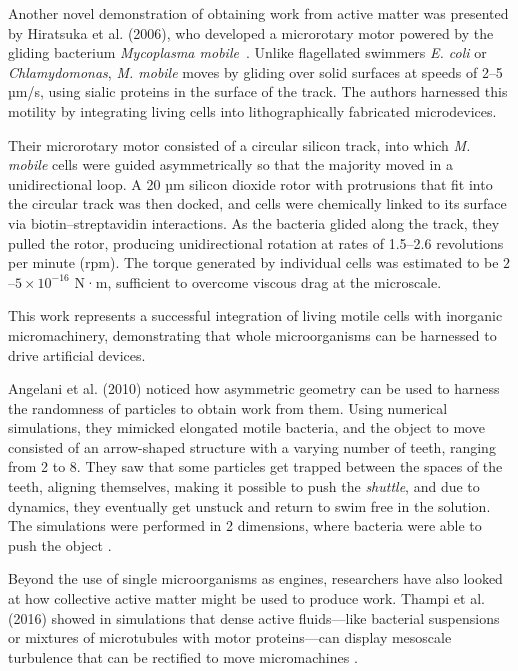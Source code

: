 Another novel demonstration of obtaining work from active matter was presented by Hiratsuka et al. (2006), who developed a microrotary motor powered by the gliding bacterium \textit{Mycoplasma mobile}~\cite{hiratsuka2006microrotary}. Unlike flagellated swimmers \textit{E. coli} or \textit{Chlamydomonas}, \textit{M. mobile} moves by gliding over solid surfaces at speeds of 2–5 µm/s, using sialic proteins in the surface of the track. The authors harnessed this motility by integrating living cells into lithographically fabricated microdevices.

Their microrotary motor consisted of a circular silicon track, into which \textit{M. mobile} cells were guided asymmetrically so that the majority moved in a unidirectional loop. A 20 µm silicon dioxide rotor with protrusions that fit into the circular track was then docked, and cells were chemically linked to its surface via biotin–streptavidin interactions. As the bacteria glided along the track, they pulled the rotor, producing unidirectional rotation at rates of 1.5–2.6 revolutions per minute (rpm). The torque generated by individual cells was estimated to be $2$–$5\times10^{-16}$ N·m, sufficient to overcome viscous drag at the microscale.

This work represents a successful integration of living motile cells with inorganic micromachinery, demonstrating that whole microorganisms can be harnessed to drive artificial devices. 


Angelani et al. (2010) noticed how asymmetric geometry can be used to harness the randomness of particles to obtain work from them. Using numerical simulations, they mimicked elongated motile bacteria, and the object to move consisted of an arrow-shaped structure with a varying number of teeth, ranging from 2 to 8. They saw that some particles get trapped between the spaces of the teeth, aligning themselves, making it possible to push the \textit{shuttle}, and due to dynamics, they eventually get unstuck and return to swim free in the solution. The simulations were performed in 2 dimensions, where bacteria were able to push the object \cite{angelani2010geometrically}.

Beyond the use of single microorganisms as engines, researchers have also looked at how collective active matter might be used to produce work. Thampi et al. (2016) showed in simulations that dense active fluids—like bacterial suspensions or mixtures of microtubules with motor proteins—can display mesoscale turbulence that can be rectified to move micromachines \cite{thampi2016active}.

